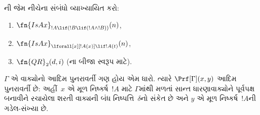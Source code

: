 \begin{prob}
ની
જેમ નીચેના સંબંધો વ્યાખ્યાયિત કરો:
\begin{enumerate}
\item $\fn{IsAx}_{!A \lif (!B \lif (!A \land !B))}(n)$,
\item $\fn{IsAx}_{\lforall[x][!A(x)] \lif !A(t)}(n)$,
\item $\fn{QR}_{2}(d, i)$
  (\QR{}ના બીજા સ્વરૂપ માટે).
\end{enumerate}
\end{prob}

\begin{prop}
$\Gamma$ એ વાક્યોનો આદિમ
પુનરાવર્તી ગણ હોય એમ ધારો.
ત્યારે $\Prf[\Gamma](x, y)$ આદિમ
પુનરાવર્તી છે: અહીં~$x$ એ
મૂળ નિષ્કર્ષ~$!A$ માટે
$\Gamma$માંથી મળતાં સાન્ત
ધારણાવાક્યોને પૂર્વપક્ષ બનાવીને
રચાયેલા શરતી વાક્યની બંધ
નિષ્પત્તિ~$\delta$નો સંકેત છે
અને $y$ એ મૂળ નિષ્કર્ષ~$!A$ની
ગડેલ-સંખ્યા છે.
\end{prop}


